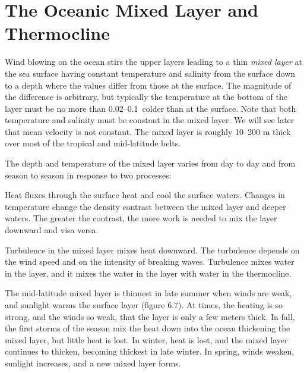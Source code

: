 \section{The Oceanic Mixed Layer and Thermocline}
Wind blowing on the ocean stirs the upper layers leading to a thin
\textit{mixed layer} at the sea surface
having constant temperature and salinity from the surface down to a
depth where the values differ from those at the surface. The magnitude
of the difference is arbitrary, but typically the temperature at the
bottom of the layer must be no more than 0.02--0.1\degrees\ colder
than at the surface. Note that both temperature and salinity must be
constant in the mixed layer. We will see later that mean velocity is
not constant. The mixed layer is roughly 10--200 m thick over most of
the tropical and mid-latitude belts.

The depth and temperature of the mixed layer varies from day to day and from season to
season in response to two processes:
\begin{enumerate}
\vitem Heat fluxes through the surface heat and cool the surface
waters. Changes in temperature change the density contrast between the
mixed layer and deeper waters. The greater the contrast, the more work
is needed to mix the layer downward and visa versa.

\vitem Turbulence in the mixed layer mixes heat downward. The
turbulence depends on the wind speed
and on the intensity of breaking waves. Turbulence mixes water in the
layer, and it mixes the water in the layer with water in the
thermocline.
\end{enumerate}

The mid-latitude mixed layer is
thinnest in late summer when winds are weak, and sunlight warms the
surface layer (figure 6.7). At times, the heating is so strong, and
the winds so weak, that the layer is only a few meters thick. In fall,
the first storms of the season mix the heat down into the ocean
thickening the mixed layer, but little heat is lost. In winter, heat
is lost, and the mixed layer continues to thicken, becoming thickest
in late winter. In spring, winds weaken, sunlight increases, and a new
mixed layer forms.

